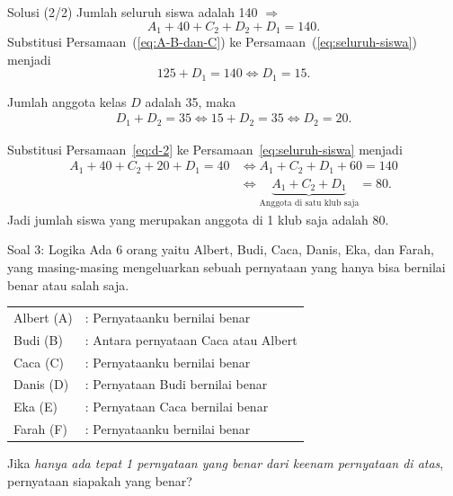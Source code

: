 \documentclass[english,t]{beamer}
\begin{document}
\begin{frame}{Solusi (2/2)}
Jumlah seluruh siswa adalah 140 $\Rightarrow$
\begin{equation}
	A_1 + 40 + C_2 + D_2 + D_1 = 140.
	\label{eq:seluruh-siswa}
\end{equation}
Substitusi Persamaan~(\ref{eq:A-B-dan-C}) ke Persamaan~(\ref{eq:seluruh-siswa}) menjadi
\begin{equation}
	125 + D_1 = 140 \Longleftrightarrow D_1 = 15.
	\label{eq:d-1}
\end{equation}

Jumlah anggota kelas $D$ adalah 35, maka 
\begin{align}
	D_1 + D_2 = 35 \Longleftrightarrow 15 + D_2 = 35 \Longleftrightarrow D_2 = 20.
	\label{eq:d-2}
\end{align}

Substitusi Persamaan~\eqref{eq:d-2} ke Persamaan~\eqref{eq:seluruh-siswa} menjadi
\begin{align*}
	A_1 + 40 + C_2 + 20 + D_1 = 40 &\Leftrightarrow A_1 + C_2 + D_1 + 60 = 140 \\
	                               &\Leftrightarrow \underbrace{A_1 + C_2 + D_1}_{\text{Anggota di satu klub saja}} = 80. 
\end{align*}
Jadi jumlah siswa yang merupakan anggota di 1 klub saja adalah 80.
\end{frame}


\begin{frame}{Soal 3: Logika}
Ada 6 orang yaitu Albert, Budi, Caca, Danis, Eka, dan Farah, yang masing-masing mengeluarkan sebuah pernyataan yang hanya bisa bernilai benar atau salah saja.

\bigskip
\begin{tabular}{ll}
Albert (A) &: Pernyataanku bernilai benar \\
Budi (B)   &: Antara pernyataan Caca atau Albert \\
Caca (C)   &: Pernyataanku bernilai benar \\
Danis (D)  &: Pernyataan Budi bernilai benar \\
Eka (E)    &: Pernyataan Caca bernilai benar \\
Farah (F)  &: Pernyataanku bernilai benar
\end{tabular} 

\bigskip
Jika \textit{hanya ada tepat 1 pernyataan yang benar dari keenam pernyataan di atas}, pernyataan siapakah yang benar?
\end{frame}
\end{document}
